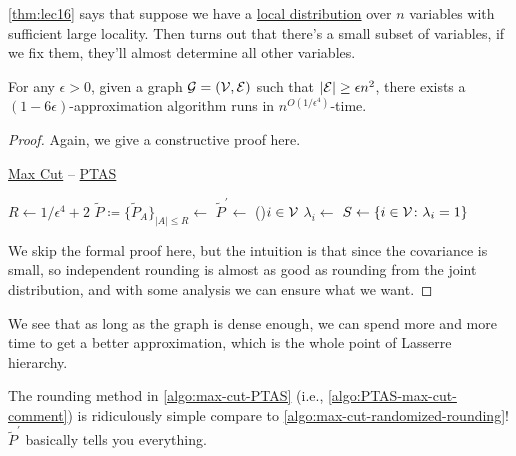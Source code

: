 \begin{remark}
	\autoref{thm:lec16} says that suppose we have a \hyperref[def:local-distribution]{local distribution} over \(n\) variables with sufficient large locality. Then turns out that there's a small subset of variables, if we fix them, they'll almost determine all other variables.
\end{remark}

\begin{theorem}\label{thm:PTAS-for-max-cut}
	For any \(\epsilon >0\), given a graph \(\mathcal{\MakeUppercase{g}} =(\mathcal{\MakeUppercase{v}} , \mathcal{\MakeUppercase{e}} )\) such that \(\left\vert \mathcal{\MakeUppercase{e}}  \right\vert \geq \epsilon n^{2} \), there exists a \((1 - 6\epsilon )\)-approximation algorithm runs in \(n^{O(1 / \epsilon ^4)}\)-time.
\end{theorem}
\begin{proof}
	Again, we give a constructive proof here.

	\begin{algorithm}[H]\label{algo:max-cut-PTAS}
		\DontPrintSemicolon
		\caption{\hyperref[prb:max-cut]{Max Cut} -- \href{https://en.wikipedia.org/wiki/Polynomial-time_approximation_scheme}{PTAS}}
		\BlankLine
		\(R\gets 1 / \epsilon ^4 + 2\)\;
		\(\widetilde{P} \coloneqq \{ \widetilde{P} _A \}_{\left\vert A \right\vert \leq R} \gets\)\;
		\(\widetilde{P} ^\prime \gets\)
		\;
		\label{algo:PTAS-max-cut-comment}
		\For(){\(i\in \mathcal{\MakeUppercase{v}} \)}{
			\(\lambda _i\gets\)\;
		}
		\(S\gets \left\{ i\in \mathcal{\MakeUppercase{v}} \colon \lambda _i = 1 \right\} \)\;
		\;
	\end{algorithm}
	We skip the formal proof here, but the intuition is that since the covariance is small, so independent rounding is almost as good as rounding from the joint distribution, and with some analysis we can ensure what we want.
\end{proof}


We see that as long as the graph is dense enough, we can spend more and more time to get a better approximation, which is the whole point of Lasserre hierarchy.

\begin{remark}
	The rounding method in \autoref{algo:max-cut-PTAS} (i.e., \autoref{algo:PTAS-max-cut-comment}) is ridiculously simple compare to \autoref{algo:max-cut-randomized-rounding}! \(\widetilde{P} ^\prime \) basically tells you everything.
\end{remark}